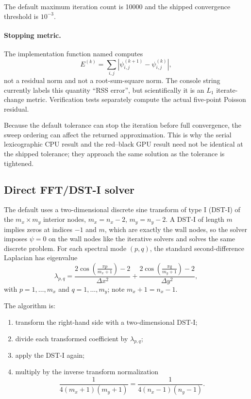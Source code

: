 \documentclass[11pt,a4paper]{article}
\newcommand{\dx}{\Delta x}
\newcommand{\dy}{\Delta y}
\newcommand{\code}[1]{\texttt{\detokenize{#1}}}
\begin{document}
The default maximum iteration count is 10000 and the shipped convergence threshold is $10^{-3}$.

\paragraph{Stopping metric.}
The implementation function named \code{error()} computes
\begin{equation}
E^{(k)}=\sum_{i,j}\left|\psi_{i,j}^{(k+1)}-\psi_{i,j}^{(k)}\right|,
\label{eq:iterate-change}
\end{equation}
not a residual norm and not a root-sum-square norm.  The console string currently labels this quantity ``RSS error'', but scientifically it is an $L_1$ iterate-change metric.  Verification tests separately compute the actual five-point Poisson residual.

Because the default tolerance can stop the iteration before full convergence, the sweep ordering can affect the returned approximation.  This is why the serial lexicographic CPU result and the red--black GPU result need not be identical at the shipped tolerance; they approach the same solution as the tolerance is tightened.

\subsection{Direct FFT/DST-I solver}
\label{sec:poisson-fft}

The default \code{poisson_type = 3} uses a two-dimensional discrete sine transform of type I (DST-I) of the $m_x\times m_y$ interior nodes, $m_x=n_x-2$, $m_y=n_y-2$.  A DST-I of length $m$ implies zeros at indices $-1$ and $m$, which are exactly the wall nodes, so the solver imposes $\psi=0$ on the wall nodes like the iterative solvers and solves the same discrete problem.  For each spectral mode $(p,q)$, the standard second-difference Laplacian has eigenvalue
\begin{equation}
\lambda_{p,q}
=
\frac{2\cos\left(\frac{\pi p}{m_x+1}\right)-2}{\dx^2}
+
\frac{2\cos\left(\frac{\pi q}{m_y+1}\right)-2}{\dy^2},
\label{eq:dst-eigenvalue}
\end{equation}
with $p=1,\dots,m_x$ and $q=1,\dots,m_y$; note $m_x+1=n_x-1$.

The algorithm is:
\begin{enumerate}[leftmargin=2em]
  \item transform the right-hand side with a two-dimensional DST-I;
  \item divide each transformed coefficient by $\lambda_{p,q}$;
  \item apply the DST-I again;
  \item multiply by the inverse transform normalization
  \[
  \frac{1}{4(m_x+1)(m_y+1)}=\frac{1}{4(n_x-1)(n_y-1)}.
  \]
\end{enumerate}
\end{document}
